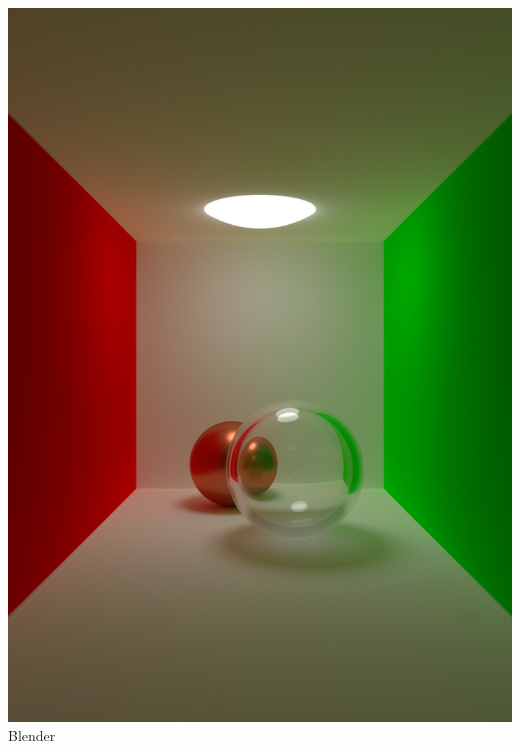 \documentclass[a4paper, 10pt]{article}
\begin{document}
\begin{center}
\begin{minipage}[b]{0.45\linewidth}
    \centering
    \includegraphics[width=\linewidth]{images/blender_out_small.png}
    Blender
\end{minipage}
\hspace{0.5cm}
\begin{minipage}[b]{0.45\linewidth}
    \centering

\end{minipage}
\end{center}
\end{document}

